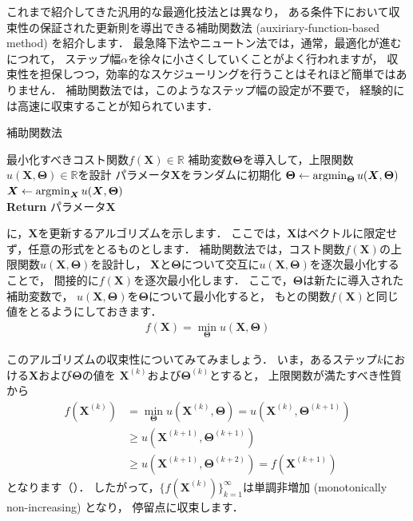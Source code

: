 これまで紹介してきた汎用的な最適化技法とは異なり，
ある条件下において収束性の保証された更新則を導出できる補助関数法 (auxiriary-function-based method) を紹介します．
最急降下法やニュートン法では，通常，最適化が進むにつれて，
ステップ幅$\alpha$を徐々に小さくしていくことがよく行われますが，
収束性を担保しつつ，効率的なスケジューリングを行うことはそれほど簡単ではありません．
補助関数法では，このようなステップ幅の設定が不要で，
経験的には高速に収束することが知られています．

\begin{algobox}{補助関数法}
\label{algo:aux_function}
\begin{algorithmic}[1]
\Require 最小化すべきコスト関数$f(\bm{X}) \in \mathbb{R}$
\State 補助変数$\bm\Theta$を導入して，上限関数$u(\bm{X}, \bm\Theta) \in \mathbb{R}$を設計
\State パラメータ$\bm{X}$をランダムに初期化
\State $\bm\Theta \gets \mathop{\mathrm{argmin}}_{\bm\Theta} u(\bm{X}, \bm\Theta)$
\State $\bm{X} \gets \mathop{\mathrm{argmin}}_{\bm{X}} u(\bm{X}, \bm\Theta)$
\EndWhile\\
{\bf Return} パラメータ$\bm{X}$
\end{algorithmic}
\end{algobox}

に，$\bm{X}$を更新するアルゴリズムを示します．
ここでは，$\bm{X}$はベクトルに限定せず，任意の形式をとるものとします．
補助関数法では，コスト関数$f(\bm{X})$の上限関数$u(\bm{X}, \bm\Theta)$を設計し，
$\bm{X}$と$\bm\Theta$について交互に$u(\bm{X}, \bm\Theta)$を逐次最小化することで，
間接的に$f(\bm{X})$を逐次最小化します．
ここで，$\bm\Theta$は新たに導入された補助変数で，
$u(\bm{X}, \bm\Theta)$を$\bm\Theta$について最小化すると，
もとの関数$f(\bm{X})$と同じ値をとるようにしておきます．
\begin{align}
f(\bm{X}) = \min_{\bm\Theta} u(\bm{X},\bm\Theta)
\end{align}

このアルゴリズムの収束性についてみてみましょう．
いま，あるステップ$k$における$\bm{X}$および$\bm\Theta$の値を
$\bm{X}^{(k)}$および$\bm\Theta^{(k)}$とすると，
上限関数が満たすべき性質から
\begin{align}
f(\bm{X}^{(k)}) 
&= \min_{\bm\Theta} u(\bm{X}^{(k)},\bm\Theta) = u(\bm{X}^{(k)},\bm\Theta^{(k + 1)})
\nonumber\\
&\ge u(\bm{X}^{(k + 1)},\bm\Theta^{(k + 1)})
\nonumber\\
&\ge u(\bm{X}^{(k + 1)},\bm\Theta^{(k + 2)})
= f(\bm{X}^{(k + 1)})
\end{align}
となります（）．
したがって，$\{f(\bm{X}^{(k)})\}_{k=1}^\infty$は単調非増加 (monotonically non-increasing) となり，
停留点に収束します．


